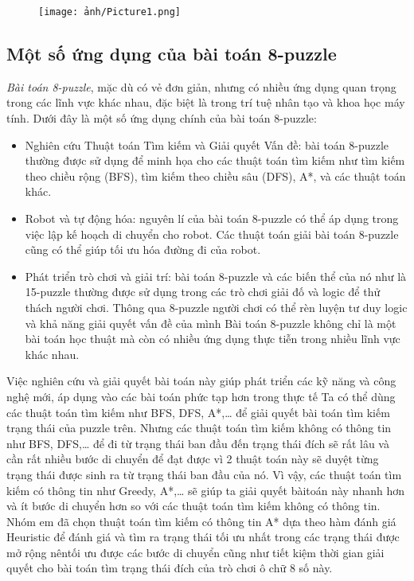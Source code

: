 \documentclass{article}
\begin{document}
\begin{figure}[h!]
\centering
\texttt{[image: ảnh/Picture1.png]}
\end{figure}


\subsection{Một số ứng dụng của bài toán 8-puzzle}
\textit{Bài toán 8-puzzle}, mặc dù có vẻ đơn giản, nhưng có nhiều ứng dụng quan trọng trong các lĩnh vực khác nhau, đặc biệt là trong trí tuệ nhân tạo và khoa học máy tính. Dưới đây là một số ứng dụng chính của bài toán 8-puzzle:
\begin{itemize}
    \item Nghiên cứu Thuật toán Tìm kiếm và Giải quyết Vấn đề: bài toán 8-puzzle thường được sử dụng để minh họa cho các thuật toán tìm kiếm như tìm kiếm theo chiều rộng (BFS), tìm kiếm theo chiều sâu (DFS), A*, và các thuật toán khác.
    \item Robot và tự động hóa: nguyên lí của bài toán 8-puzzle có thể áp dụng trong việc lập kế hoạch di chuyển cho robot. Các thuật toán giải bài toán 8-puzzle cũng có thể giúp tối ưu hóa đường đi của robot.
    \item Phát triển trò chơi và giải trí: bài toán 8-puzzle và các biến thể của nó như là 15-puzzle thường được sử dụng trong các trò chơi giải đố và logic để thử thách người chơi. Thông qua 8-puzzle người chơi có thể rèn luyện tư duy logic và khả năng giải quyết vấn đề của mình Bài toán 8-puzzle không chỉ là một bài toán học thuật mà còn có nhiều ứng dụng thực tiễn trong nhiều lĩnh vực khác nhau. 
\end{itemize} 


Việc nghiên cứu và giải quyết bài toán này giúp phát triển các kỹ năng và công nghệ mới, áp dụng vào các bài toán phức tạp hơn trong thực tế 
Ta có thể dùng các thuật toán tìm kiếm như BFS, DFS, A*,… để giải quyết bài toán tìm kiếm trạng thái của puzzle trên. Nhưng các thuật toán tìm kiếm không có thông tin như BFS, DFS,… để đi từ trạng thái ban đầu đến trạng thái đích sẽ rất lâu và cần rất nhiều bước di chuyển để đạt được vì 2 thuật toán này sẽ duyệt từng trạng thái được sinh ra từ trạng thái ban đầu của nó. Vì vậy, các thuật toán tìm kiếm có thông tin như Greedy, A*,… sẽ giúp ta giải quyết bàitoán này nhanh hơn và ít bước di chuyển hơn so với các thuật toán tìm kiếm không có thông tin. Nhóm em đã chọn thuật toán tìm kiếm có thông tin A* dựa theo hàm đánh giá Heuristic để đánh giá và tìm ra trạng thái tối ưu nhất trong các trạng thái được mở rộng nêntối ưu được các bước di chuyển cũng như tiết kiệm thời gian giải quyết cho bài toán tìm trạng thái đích của trò chơi ô chữ 8 số này.
\end{document}

